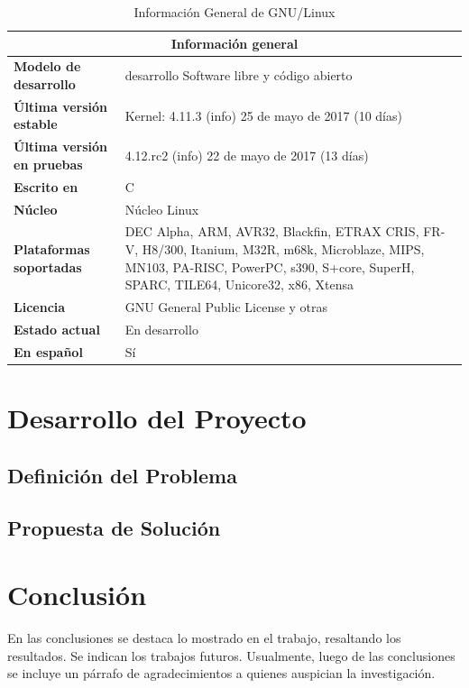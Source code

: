 \documentclass[12pt]{report}
\begin{document}
\begin{table}[hbt]
\begin{center}
\begin{tabular}{|l|p{10cm}|}\hline
\multicolumn{2}{|c|}{\textbf{Información general}}\\
\hline
\textbf{Modelo de desarrollo}&desarrollo	Software libre y código abierto\\
\textbf{Última versión estable}&Kernel: 4.11.3 (info) 25 de mayo de 2017 (10 días)\\
\textbf{Última versión en pruebas}&	4.12.rc2 (info) 22 de mayo de 2017 (13 días)\\
\textbf{Escrito en}&	C\\
\textbf{Núcleo}&	Núcleo Linux\\
\textbf{Plataformas soportadas}	& DEC Alpha, ARM, AVR32, Blackfin, ETRAX CRIS, FR-V, H8/300, Itanium, M32R, m68k, Microblaze, MIPS, MN103, PA-RISC, PowerPC, s390, S+core, SuperH, SPARC, TILE64, Unicore32, x86, Xtensa\\
\textbf{Licencia}	&GNU General Public License y otras\\
\textbf{Estado actual}	&En desarrollo\\
\textbf{En español}	&Sí\\
\hline
\end{tabular}
\end{center}
\caption{Información General de GNU/Linux}
\label{t:info}
\end{table}


\chapter{Desarrollo del Proyecto}
\lipsum[1]%

\section{Definición del Problema}
\lipsum[1]%

\section{Propuesta de Solución}
\lipsum[1]%



\chapter{Conclusión}
En las conclusiones se destaca lo mostrado en el trabajo, resaltando los resultados. Se indican los trabajos futuros. Usualmente, luego de las conclusiones se incluye un párrafo de agradecimientos a quienes auspician la investigación.
\end{document}
